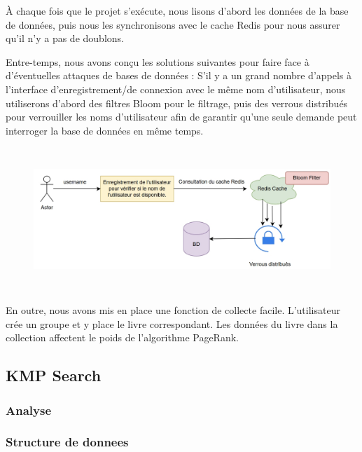 \documentclass[11pt,english]{article}
\begin{document}
{    \indent À chaque fois que le projet s'exécute, nous lisons d'abord les données de la base de données, puis nous les synchronisons avec le cache Redis pour nous assurer qu'il n'y a pas de doublons.

    \indent Entre-temps, nous avons conçu les solutions suivantes pour faire face à d'éventuelles attaques de bases de données :
    S'il y a un grand nombre d'appels à l'interface d'enregistrement/de connexion avec le même nom d'utilisateur, nous utiliserons d'abord des filtres Bloom pour le filtrage, puis des verrous distribués pour verrouiller les noms d'utilisateur afin de garantir qu'une seule demande peut interroger la base de données en même temps.

    \begin{figure}[H]
        \begin{center}
            \includegraphics[height=5.4cm]{./src/user_regis.png}
        \end{center}
    \end{figure}

    \indent En outre, nous avons mis en place une fonction de collecte facile. L'utilisateur crée un groupe et y place le livre correspondant. Les données du livre dans la collection affectent le poids de l'algorithme PageRank.

    \subsection{KMP Search}

    \subsubsection{Analyse}

    \subsubsection{Structure de donnees}

}
\end{document}
